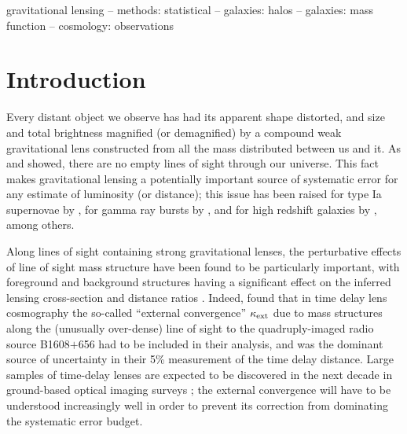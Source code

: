 \documentclass[useAMS,usenatbib,a4paper]{mn2e}
\begin{document}

\begin{keywords}
  gravitational lensing   --
  methods: statistical    --
  galaxies: halos         --
  galaxies: mass function  --
  cosmology: observations
\end{keywords}

\setcounter{footnote}{1}


\section{Introduction}
\label{sec:intro}

Every distant object we observe has had its apparent shape distorted,
and size and total brightness magnified (or demagnified) by a compound
weak gravitational lens constructed from all the mass distributed
between us and it. As \citet{Vale+White2003} and \citet{HilbertEtal2007}
showed, there are no empty lines of sight through our universe. This
fact makes gravitational lensing a potentially important source of
systematic error for any estimate of luminosity (or distance); this 
issue has been 
raised for \eg type Ia supernovae by
\citet[][]{Holz+Wald1998,Holz+Linder2005}, for gamma ray bursts by
\citet[][]{Oguri+Takahashi2006,Wang+Dai2011},  and for high redshift
galaxies by \citet{WyitheEtal2011}, among others. 

Along lines of sight containing strong gravitational lenses, the perturbative
effects of line of sight mass structure have been found to be particularly
important, with foreground and background structures having a significant
effect on the inferred lensing cross-section \citep[\eg][]{WongEtal2012} and
distance ratios \citep[][]{DalalEtal2005}. Indeed, \citet{SuyuEtal2010} found
that in time delay lens cosmography the so-called ``external convergence''
$\kappa_{\rm ext}$ due to mass structures along the (unusually over-dense) line of
sight to the quadruply-imaged radio source B1608$+$656 had to be included in
their analysis, and was the dominant source of uncertainty in their 5\%
measurement of the time  delay distance.  Large samples of time-delay lenses
are expected to be discovered in the next decade in ground-based optical
imaging surveys \citep{Oguri+Marshall2010};  the external convergence will
have to be understood increasingly well in order to prevent its correction
from dominating the systematic error budget.
\end{document}
